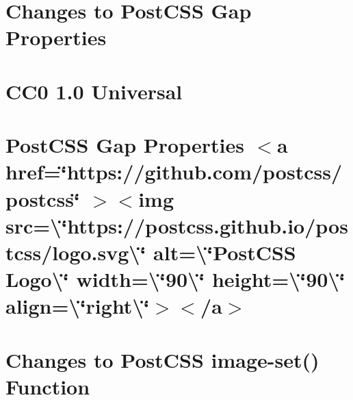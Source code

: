\documentclass[twoside]{book}
\newcommand{\+}{\discretionary{\mbox{\scriptsize$\hookleftarrow$}}{}{}}
\begin{document}
\chapter{Changes to Post\+CSS Gap Properties}
\label{md__c___users_vaishnavi_jadhav__desktop__developer_code_mean_stack_example_client_node_modules_p4712c8ebb3ff82a6e7849ed6ab45ceae}

\chapter{CC0 1.0 Universal}
\label{md__c___users_vaishnavi_jadhav__desktop__developer_code_mean_stack_example_client_node_modules_p67eeeed540dd01433b94dd24befda0f3}

\chapter{Post\+CSS Gap Properties \texorpdfstring{$<$}{<}a href=\char`\"{}https\+://github.\+com/postcss/postcss\char`\"{} \texorpdfstring{$>$}{>}\texorpdfstring{$<$}{<}img src=\textbackslash{}\char`\"{}https\+://postcss.\+github.\+io/postcss/logo.\+svg\textbackslash{}\char`\"{} alt=\textbackslash{}\char`\"{}\+Post\+CSS Logo\textbackslash{}\char`\"{} width=\textbackslash{}\char`\"{}90\textbackslash{}\char`\"{} height=\textbackslash{}\char`\"{}90\textbackslash{}\char`\"{} align=\textbackslash{}\char`\"{}right\textbackslash{}\char`\"{}\texorpdfstring{$>$}{>}\texorpdfstring{$<$}{<}/a\texorpdfstring{$>$}{>}}
\label{md__c___users_vaishnavi_jadhav__desktop__developer_code_mean_stack_example_client_node_modules_pb16504c2b9776da45bd755b2ef99a315}

\chapter{Changes to Post\+CSS image-\/set() Function}
\label{md__c___users_vaishnavi_jadhav__desktop__developer_code_mean_stack_example_client_node_modules_p76a240ca1d1bfc39136ff82934f514ea}

\end{document}
